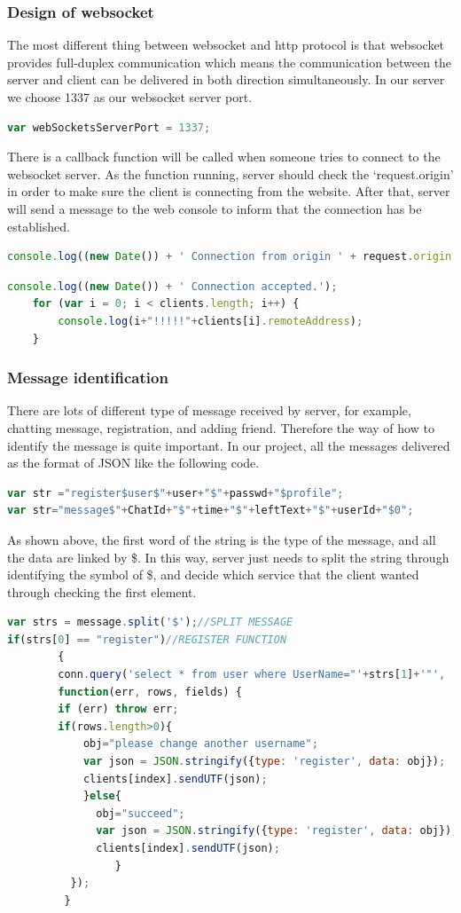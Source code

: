 \documentclass[a4paper,11pt]{article}
\begin{document}
\subsubsection{Design of websocket}
The most different thing between websocket and http protocol is that websocket provides full-duplex communication which means the communication between the server and client can be delivered in both direction simultaneously. In our server we choose 1337 as our websocket server port.
\begin{lstlisting}[language=javascript]
var webSocketsServerPort = 1337;
\end{lstlisting}
There is a callback function will be called when someone tries to connect to the websocket server. As the function running, server should check the ‘request.origin’ in order to make sure the client is connecting from the website. After that, server will send a message to the web console to inform that the connection has be established.
\begin{lstlisting}[language=javascript]
  console.log((new Date()) + ' Connection from origin ' + request.origin + '.');
\end{lstlisting}
\begin{lstlisting}[language=javascript]
  console.log((new Date()) + ' Connection accepted.');
    for (var i = 0; i < clients.length; i++) {
        console.log(i+"!!!!!"+clients[i].remoteAddress);
    }
\end{lstlisting}
\subsubsection{Message identification}
There are lots of different type of message received by server, for example, chatting message, registration, and adding friend. Therefore the way of how to identify the message is quite important. In our project, all the messages delivered as the format of JSON like the following code.
\begin{lstlisting}[language=javascript]
var str ="register$user$"+user+"$"+passwd+"$profile";
var str="message$"+ChatId+"$"+time+"$"+leftText+"$"+userId+"$0";
\end{lstlisting}
As shown above, the first word of the string is the type of the message, and all the data are linked by \$. In this way, server just needs to split the string through identifying the symbol of \$, and decide which service that the client wanted through checking the first element.
\begin{lstlisting}[language=javascript]
var strs = message.split('$');//SPLIT MESSAGE
if(strs[0] == "register")//REGISTER FUNCTION
        {
        conn.query('select * from user where UserName="'+strs[1]+'"',
        function(err, rows, fields) {
        if (err) throw err;
        if(rows.length>0){
            obj="please change another username";
            var json = JSON.stringify({type: 'register', data: obj});
            clients[index].sendUTF(json);
            }else{
              obj="succeed";
              var json = JSON.stringify({type: 'register', data: obj});
              clients[index].sendUTF(json);
                 }
          });
         }
\end{lstlisting}
\end{document}
